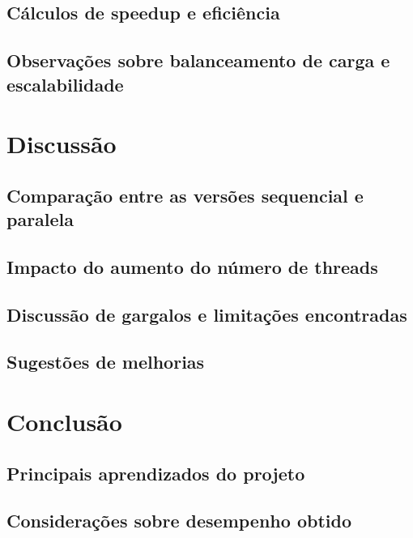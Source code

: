 \documentclass[12pt, a4paper]{article}
\begin{document}
	\subsection{Cálculos de speedup e eficiência}

	\subsection{Observações sobre balanceamento de carga e escalabilidade}

	\section{Discussão}

	\subsection{Comparação entre as versões sequencial e paralela}

	\subsection{Impacto do aumento do número de threads}

	\subsection{Discussão de gargalos e limitações encontradas}

	\subsection{Sugestões de melhorias}

	\section{Conclusão}

	\subsection{Principais aprendizados do projeto}

	\subsection{Considerações sobre desempenho obtido}
\end{document}
